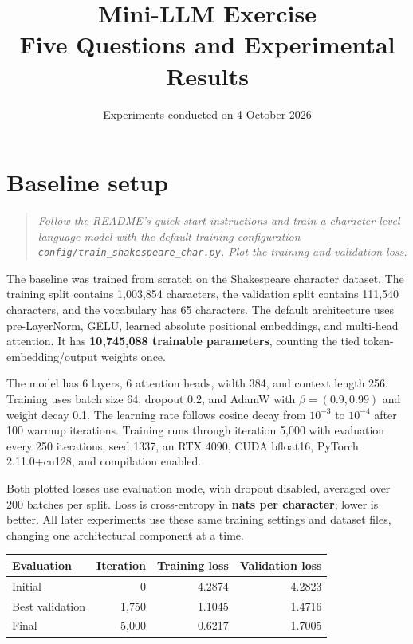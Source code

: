 \documentclass[10pt]{article}
\title{\vspace{-1.6em}Mini-LLM Exercise\\[3pt]
  \large Five Questions and Experimental Results}
\author{}
\date{Experiments conducted on 4 October 2026}
\newcommand{\prompt}[1]{\begin{quote}\small\itshape #1\end{quote}}
\begin{document}
\maketitle
\vspace{-2em}

\section{Baseline setup}
\prompt{Follow the README's quick-start instructions and train a character-level
language model with the default training configuration
\texttt{config/train\_shakespeare\_char.py}. Plot the training and validation loss.}

The baseline was trained from scratch on the Shakespeare character dataset.
The training split contains 1,003,854 characters, the validation split contains
111,540 characters, and the vocabulary has 65 characters. The default architecture
uses pre-LayerNorm, GELU, learned absolute positional embeddings, and multi-head
attention. It has \textbf{10,745,088 trainable parameters}, counting the tied
token-embedding/output weights once.

The model has 6 layers, 6 attention heads, width 384, and context length 256.
Training uses batch size 64, dropout 0.2, and AdamW with $\beta=(0.9,0.99)$ and
weight decay 0.1. The learning rate follows cosine decay from $10^{-3}$ to
$10^{-4}$ after 100 warmup iterations. Training runs through iteration 5,000
with evaluation every 250 iterations, seed 1337, an RTX 4090, CUDA bfloat16,
PyTorch 2.11.0+cu128, and compilation enabled.

Both plotted losses use evaluation mode, with dropout disabled, averaged over
200 batches per split. Loss is cross-entropy in \textbf{nats per character}; lower
is better. All later experiments use these same training settings and dataset
files, changing one architectural component at a time.

\begin{center}
\small
\begin{tabular}{@{}lrrr@{}}
\toprule
Evaluation & Iteration & Training loss & Validation loss \\
\midrule
Initial & 0 & 4.2874 & 4.2823 \\
Best validation & 1,750 & 1.1045 & 1.4716 \\
Final & 5,000 & 0.6217 & 1.7005 \\
\bottomrule
\end{tabular}
\end{center}
\end{document}
